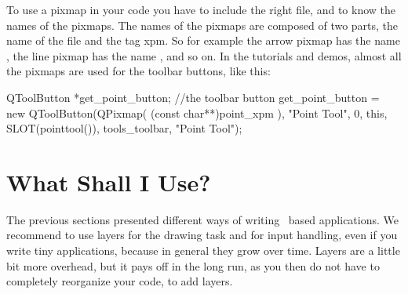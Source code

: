 













To use a pixmap in your code you have to include the right file, and
to know the names of the pixmaps. The names of the pixmaps are
composed of two parts, the name of the file and the tag xpm. So for
example the arrow pixmap has the name , the line
pixmap has the name , and so on. In the
tutorials and demos, almost all the pixmaps are used for the toolbar
buttons, like this:

\ccExample
\begin{ccExampleCode}
    QToolButton *get_point_button; //the toolbar button
    get_point_button =  new QToolButton(QPixmap( (const char**)point_xpm ),
                                     "Point Tool", 
                                     0, 
                                     this, 
                                     SLOT(pointtool()), 
                                     tools_toolbar, 
                                     "Point Tool");
\end{ccExampleCode}



\section{What Shall I Use?}

The previous sections presented different ways of writing \qt\ based 
applications. We recommend to use layers for the drawing task and for
input handling, even if you write tiny applications, because in general
they grow over time. Layers are a little bit more overhead, but 
it pays off in the long run, as you then do not have to completely
reorganize your code, to add layers. 








